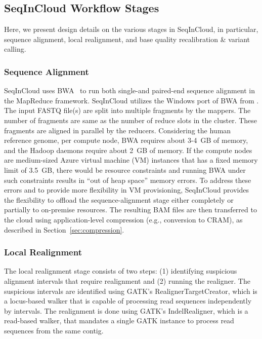 \subsection{SeqInCloud Workflow Stages}

Here, we present design details on the various stages in SeqInCloud, in particular, sequence alignment, local realignment, and base quality  recalibration \& variant calling.

\subsubsection{Sequence Alignment} 
SeqInCloud uses BWA~\cite{surveyalgo} to run both single-and paired-end sequence alignment in the MapReduce framework. SeqInCloud utilizes the Windows port of BWA from \cite{BOW}. The input FASTQ file(s) are split into multiple fragments by the mappers. The number of fragments are same as the number of reduce slots in the cluster. These fragments are aligned in parallel by the reducers. Considering the human reference genome, per compute node, BWA requires about 3-4~GB of memory, and the Hadoop daemons require about 2~GB of memory. If the compute nodes are medium-sized Azure virtual machine (VM) instances that has a fixed memory limit of 3.5~GB, there would be resource constraints and running BWA under such constraints results in ``out of heap space'' memory errors. To address these errors and to provide more flexibility in VM provisioning, SeqInCloud provides the flexibility to offload the sequence-alignment stage either completely or partially to on-premise resources. The resulting BAM files are then transferred to the cloud using application-level compression (e.g., conversion to CRAM), as described in Section~\ref{sec:compression}.

\subsubsection{Local Realignment}

The local realignment stage consists of two steps: (1) identifying suspicious alignment intervals
that require realignment and (2) running the realigner. The suspicious intervals are identified using GATK's RealignerTargetCreator, which is a locus-based walker that is capable of processing read sequences independently by intervals. The realignment is done using GATK's IndelRealigner, which is a read-based walker, that mandates a single GATK instance to process read sequences from the same contig.  

